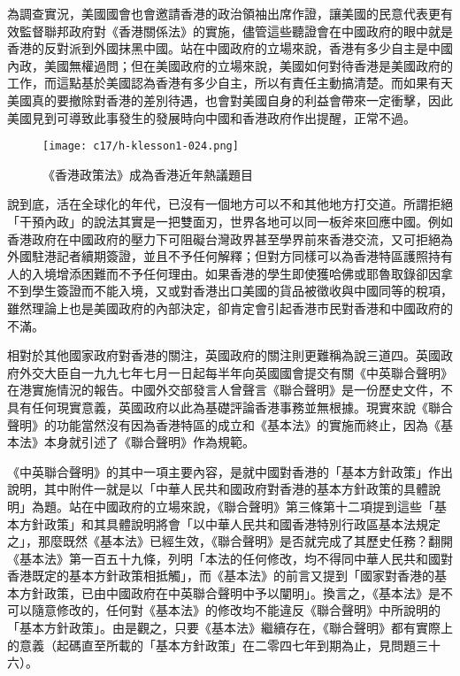 為調查實況，美國國會也會邀請香港的政治領袖出席作證，讓美國的民意代表更有效監督聯邦政府對《香港關係法》的實施，儘管這些聽證會在中國政府的眼中就是香港的反對派到外國抹黑中國。站在中國政府的立場來說，香港有多少自主是中國內政，美國無權過問；但在美國政府的立場來說，美國如何對待香港是美國政府的工作，而這點基於美國認為香港有多少自主，所以有責任主動搞清楚。而如果有天美國真的要撤除對香港的差別待遇，也會對美國自身的利益會帶來一定衝擊，因此美國見到可導致此事發生的發展時向中國和香港政府作出提醒，正常不過。

\begin{figure}[htbp]
    \centering
    \texttt{[image: c17/h-klesson1-024.png]}
    \caption{《香港政策法》成為香港近年熱議題目} 
\end{figure}

說到底，活在全球化的年代，已沒有一個地方可以不和其他地方打交道。所謂拒絕「干預內政」的說法其實是一把雙面刃，世界各地可以同一板斧來回應中國。例如香港政府在中國政府的壓力下可阻礙台灣政界甚至學界前來香港交流，又可拒絕為外國駐港記者續期簽證，並且不予任何解釋；但對方同樣可以為香港特區護照持有人的入境增添困難而不予任何理由。如果香港的學生即使獲哈佛或耶魯取錄卻因拿不到學生簽證而不能入境，又或對香港出口美國的貨品被徵收與中國同等的稅項，雖然理論上也是美國政府的內部決定，卻肯定會引起香港市民對香港和中國政府的不滿。

相對於其他國家政府對香港的關注，英國政府的關注則更難稱為說三道四。英國政府外交大臣自一九九七年七月一日起每半年向英國國會提交有關《中英聯合聲明》在港實施情況的報告。中國外交部發言人曾聲言《聯合聲明》是一份歷史文件，不具有任何現實意義，英國政府以此為基礎評論香港事務並無根據。現實來說《聯合聲明》的功能當然沒有因為香港特區的成立和《基本法》的實施而終止，因為《基本法》本身就引述了《聯合聲明》作為規範。

《中英聯合聲明》的其中一項主要內容，是就中國對香港的「基本方針政策」作出說明，其中附件一就是以「中華人民共和國政府對香港的基本方針政策的具體說明」為題。站在中國政府的立場來說，《聯合聲明》第三條第十二項提到這些「基本方針政策」和其具體說明將會「以中華人民共和國香港特別行政區基本法規定之」，那麼既然《基本法》已經生效，《聯合聲明》是否就完成了其歷史任務？翻開《基本法》第一百五十九條，列明「本法的任何修改，均不得同中華人民共和國對香港既定的基本方針政策相抵觸」，而《基本法》的前言又提到「國家對香港的基本方針政策，已由中國政府在中英聯合聲明中予以闡明」。換言之，《基本法》是不可以隨意修改的，任何對《基本法》的修改均不能違反《聯合聲明》中所說明的「基本方針政策」。由是觀之，只要《基本法》繼續存在，《聯合聲明》都有實際上的意義（起碼直至所載的「基本方針政策」在二零四七年到期為止，見問題三十六）。

